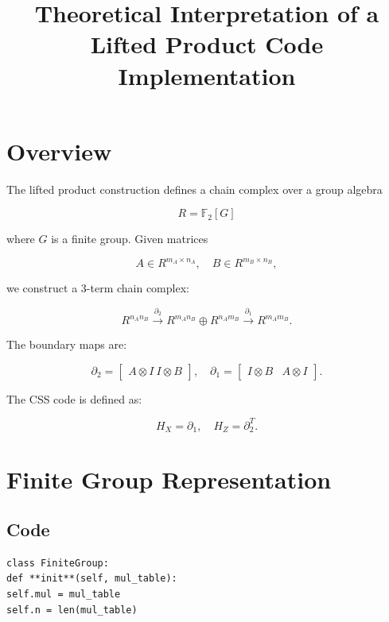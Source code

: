 \documentclass[11pt]{article}
\title{Theoretical Interpretation of a Lifted Product Code Implementation}
\author{}
\date{}
\begin{document}
\maketitle

\section{Overview}

The lifted product construction defines a chain complex over a group algebra

\begin{equation}
R = \mathbb{F}_2[G]
\end{equation}

where $G$ is a finite group. Given matrices

\begin{equation}
A \in R^{m_A \times n_A}, \quad B \in R^{m_B \times n_B},
\end{equation}

we construct a 3-term chain complex:

\begin{equation}
R^{n_A n_B}
\overset{\partial_2}{\longrightarrow}
R^{m_A n_B} \oplus R^{n_A m_B}
\overset{\partial_1}{\longrightarrow}
R^{m_A m_B}.
\end{equation}

The boundary maps are:

\begin{equation}
\partial_2 =
\begin{bmatrix}
A \otimes I \
I \otimes B
\end{bmatrix},
\quad
\partial_1 =
\begin{bmatrix}
I \otimes B & A \otimes I
\end{bmatrix}.
\end{equation}

The CSS code is defined as:

\begin{equation}
H_X = \partial_1, \quad H_Z = \partial_2^{T}.
\end{equation}

\section{Finite Group Representation}

\subsection{Code}
\begin{verbatim}
class FiniteGroup:
def **init**(self, mul_table):
self.mul = mul_table
self.n = len(mul_table)
\end{verbatim}
\end{document}
